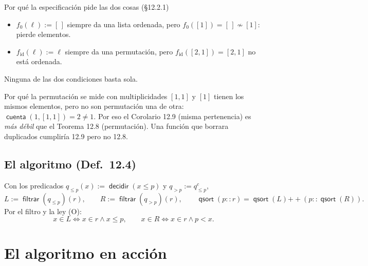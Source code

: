 \documentclass[11pt,a4paper]{article}
\newcommand{\Perm}{\sim}
\newcommand{\concat}{\mathbin{+\!\!+}}
\newcommand{\qs}{\operatorname{\mathsf{qsort}}}
\newcommand{\filt}{\operatorname{\mathsf{filtrar}}}
\newcommand{\cuenta}{\operatorname{\mathsf{cuenta}}}
\newcommand{\decidir}{\operatorname{\mathsf{decidir}}}
\begin{document}
\begin{ejemplo}{Por qué la especificación pide las dos cosas (§12.2.1)}
\begin{itemize}
  \item \(f_0(\ell):=[\,]\) siempre da una lista ordenada, pero
    \(f_0([1])=[\,]\not\Perm[1]\): pierde elementos.
  \item \(f_{\mathrm{id}}(\ell):=\ell\) siempre da una permutación, pero
    \(f_{\mathrm{id}}([2,1])=[2,1]\) no está ordenada.
\end{itemize}
Ninguna de las dos condiciones basta sola.
\end{ejemplo}

\begin{ejemplo}{Por qué la permutación se mide con multiplicidades}
\([1,1]\) y \([1]\) tienen los mismos elementos, pero no son permutación una
de otra: \(\cuenta(1,[1,1])=2\neq1\). Por eso el Corolario 12.9 (misma
pertenencia) es \emph{más débil} que el Teorema 12.8 (permutación). Una
función que borrara duplicados cumpliría 12.9 pero no 12.8.
\end{ejemplo}

\subsection{El algoritmo (Def.~12.4)}

Con los predicados \(q_{\leq p}(x):=\decidir(x\leq p)\) y
\(q_{>p}:=q_{\leq p}^c\),
\[
L:=\filt(q_{\leq p})(r),\qquad R:=\filt(q_{>p})(r),\qquad
\qs(p::r)=\qs(L)\concat(p::\qs(R)).
\]
Por el filtro y la ley (O):
\[
x\in L\iff x\in r\wedge x\leq p,\qquad
x\in R\iff x\in r\wedge p<x .
\]

\section{El algoritmo en acción}
\end{document}
